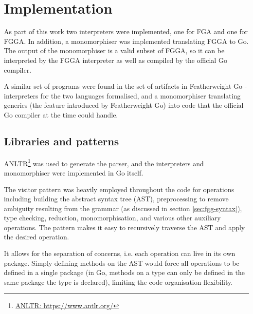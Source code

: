 \section{Implementation}
\label{ch:interpter-impl}

As part of this work two interpreters were implemented, one for FGA and one for
FGGA. In addition, a monomorphiser was implemented translating FGGA to Go. The
output of the monomorphiser is a valid subset of FGGA, so it can be interpreted
by the FGGA interpreter as well as compiled by the official Go compiler.

A similar set of programs were found in the set of artifacts in Featherweight Go
\autocite{fg} - interpreters for the two languages formalised, and a
monomorphiser translating generics (the feature introduced by Featherweight Go)
into code that the official Go compiler at the time could handle.

\subsection{Libraries and patterns}

ANLTR\footnote{\href{https://www.antlr.org/}{ANLTR: https://www.antlr.org/}} was
used to generate the parser, and the interpreters and monomorphiser were
implemented in Go itself.

The visitor pattern was heavily employed throughout the code for operations
including building the abstract syntax tree (AST), preprocessing to remove
ambiguity resulting from the grammar (as discussed in section
\ref{sec:fgg-syntax}), type checking, reduction, monomorphisation, and various
other auxiliary operations. The pattern makes it easy to recursively traverse
the AST and apply the desired operation.


It allows for the separation of concerns, i.e. each operation can live in its
own package. Simply defining methods on the AST would force all operations to be
defined in a single package (in Go, methods on a type can only be defined in the
same package the type is declared), limiting the code organisation flexibility.


